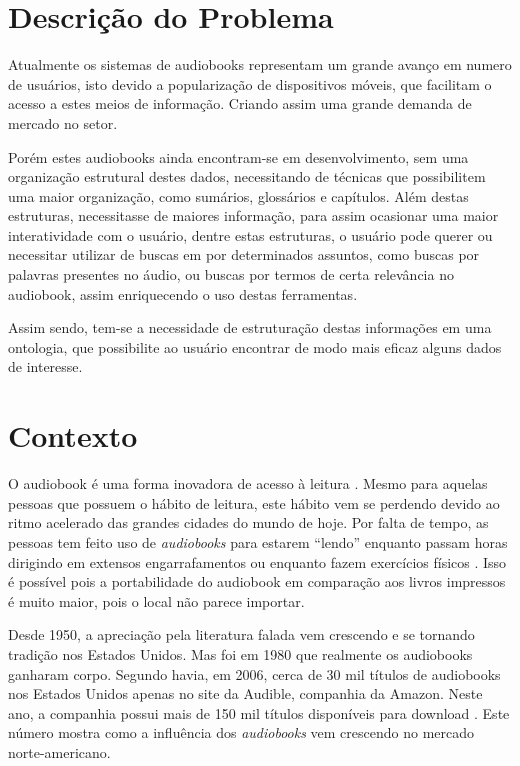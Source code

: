\section{Descrição do Problema}

Atualmente os sistemas de audiobooks representam um grande avanço em numero de usuários, isto devido a popularização de dispositivos móveis, que facilitam o acesso a estes meios de informação. Criando assim uma grande demanda de mercado no setor.

Porém estes audiobooks ainda encontram-se em desenvolvimento, sem uma organização estrutural destes dados, necessitando de técnicas que possibilitem uma maior organização, como sumários, glossários e capítulos. Além destas estruturas, necessitasse de maiores informação, para assim ocasionar uma maior interatividade com o usuário, dentre estas estruturas, o usuário pode querer ou necessitar utilizar de buscas em por determinados assuntos, como buscas por palavras presentes no áudio, ou buscas por termos de certa relevância no audiobook, assim enriquecendo o uso destas ferramentas.

Assim sendo, tem-se a necessidade de estruturação destas informações em uma ontologia, que possibilite ao usuário encontrar de modo mais eficaz alguns dados de interesse. 

\section{Contexto}

O audiobook é uma forma inovadora de acesso à leitura \cite{audiobooksuporte}. Mesmo para aquelas pessoas que possuem o hábito de leitura, este hábito vem se perdendo devido ao ritmo acelerado das grandes cidades do mundo de hoje. Por falta de tempo, as pessoas tem feito uso de \textit{audiobooks} para estarem ``lendo'' enquanto passam horas dirigindo em extensos engarrafamentos ou enquanto fazem exercícios físicos \cite{audiobookinovacao}. Isso é possível pois a portabilidade do audiobook em comparação aos livros impressos é muito maior, pois o local não parece importar.

Desde 1950, a apreciação pela literatura falada vem crescendo e se tornando tradição nos Estados Unidos. Mas foi em 1980 que realmente os audiobooks ganharam corpo. Segundo \cite{teixeira} havia, em 2006, cerca de 30 mil títulos de audiobooks nos Estados Unidos apenas no site da Audible, companhia da Amazon. Neste ano, a companhia possui mais de 150 mil títulos disponíveis para download \cite{audible}. Este número mostra como a influência dos \textit{audiobooks} vem crescendo no mercado norte-americano.

